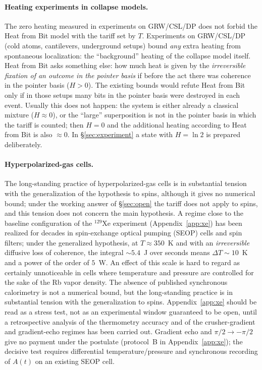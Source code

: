 \documentclass[11pt,a4paper]{article}
\newcommand{\Sref}[1]{\hyperref[#1]{\S\ref{#1}}}
\begin{document}
\paragraph{Heating experiments in collapse models.}
The zero heating measured in experiments on GRW/CSL/DP does not forbid the Heat from Bit model with the tariff set by $T$. Experiments on GRW/CSL/DP~\cite{bassi2013,donadi2021} (cold atoms, cantilevers, underground setups) bound \emph{any} extra heating from spontaneous localization: the ``background'' heating of the collapse model itself. Heat from Bit asks something else: how much heat is given by the \emph{irreversible fixation of an outcome in the pointer basis} if before the act there was coherence in the pointer basis ($H>0$). The existing bounds would refute Heat from Bit only if in those setups many bits in the pointer basis were destroyed in each event. Usually this does not happen: the system is either already a classical mixture ($H\approx 0$), or the ``large'' superposition is not in the pointer basis in which the tariff is counted; then $H=0$ and the additional heating according to Heat from Bit is also $\approx 0$. In \Sref{sec:experiment} a state with $H=\ln 2$ is prepared deliberately.

\paragraph{Hyperpolarized-gas cells.}
The long-standing practice of hyperpolarized-gas cells is in substantial tension with the generalization of the hypothesis to spins, although it gives no numerical bound; under the working answer of \Sref{sec:open} the tariff does not apply to spins, and this tension does not concern the main hypothesis. A regime close to the baseline configuration of the $^{129}$Xe experiment (Appendix~\ref{app:xe}) has been realized for decades in spin-exchange optical pumping (SEOP) cells and spin filters; under the generalized hypothesis, at $T \approx 350$~K and with an \emph{irreversible} diffusive loss of coherence, the integral $\sim 5.4$~J over seconds means $\Delta T\sim10$~K and a power of the order of $5$~W. An effect of this scale is hard to regard as certainly unnoticeable in cells where temperature and pressure are controlled for the sake of the Rb vapor density. The absence of published synchronous calorimetry is not a numerical bound, but the long-standing practice is in substantial tension with the generalization to spins. Appendix~\ref{app:xe} should be read as a stress test, not as an experimental window guaranteed to be open, until a retrospective analysis of the thermometry accuracy and of the crusher-gradient and gradient-echo regimes has been carried out. Gradient echo and $\pi/2\to-\pi/2$ give no payment under the postulate (protocol~B in Appendix~\ref{app:xe}); the decisive test requires differential temperature/pressure and synchronous recording of $A(t)$ on an existing SEOP cell.
\end{document}
